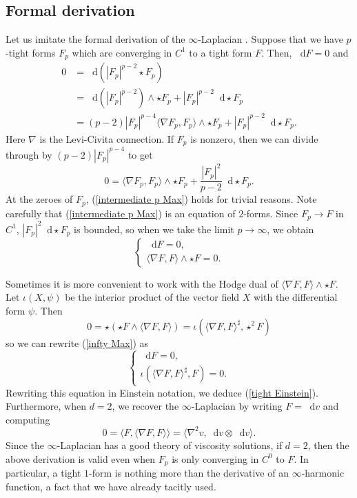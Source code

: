 \documentclass[reqno,11pt]{amsart}
\newcommand*\dif{\mathop{}\!\mathrm{d}}
\theoremstyle{definition}
\numberwithin{equation}{section}
\begin{document}
\subsection{Formal derivation}
Let us imitate the formal derivation of the $\infty$-Laplacian \cite{Aronsson67}.
Suppose that we have $p$-tight forms $F_p$ which are converging in $C^1$ to a tight form $F$.
Then, $\dif F = 0$ and
\begin{align*}
0
&= \dif(|F_p|^{p - 2} \star F_p) \\
&= \dif(|F_p|^{p - 2}) \wedge \star F_p + |F_p|^{p - 2} \dif \star F_p \\
&= (p - 2) |F_p|^{p - 4} \langle \nabla F_p, F_p\rangle \wedge \star F_p + |F_p|^{p - 2} \dif \star F_p.
\end{align*}
Here $\nabla$ is the Levi-Civita connection.
If $F_p$ is nonzero, then we can divide through by $(p - 2) |F_p|^{p - 4}$ to get
\begin{equation}\label{intermediate p Max}
0 = \langle\nabla F_p, F_p\rangle \wedge \star F_p + \frac{|F_p|^2}{p - 2} \dif \star F_p.
\end{equation}
At the zeroes of $F_p$, (\ref{intermediate p Max}) holds for trivial reasons.
Note carefully that (\ref{intermediate p Max}) is an equation of $2$-forms.
Since $F_p \to F$ in $C^1$, $|F_p|^2 \dif \star F_p$ is bounded, so when we take the limit $p \to \infty$, we obtain 
\begin{equation}\label{infty Max}
\begin{cases}
\dif F = 0, \\
\langle \nabla F, F\rangle \wedge \star F = 0.
\end{cases}
\end{equation}

Sometimes it is more convenient to work with the Hodge dual of $\langle \nabla F, F\rangle \wedge \star F$.
Let $\iota(X, \psi)$ be the interior product of the vector field $X$ with the differential form $\psi$.
Then 
$$0 = \star(\star F \wedge \langle \nabla F, F\rangle) = \iota(\langle \nabla F, F\rangle^\sharp, \star^2 F)$$
so we can rewrite (\ref{infty Max}) as
\begin{equation}\label{dual infty Max}
\begin{cases}
\dif F = 0, \\
\iota(\langle \nabla F, F\rangle^\sharp, F) = 0.
\end{cases}
\end{equation}
Rewriting this equation in Einstein notation, we deduce (\ref{tight Einstein}).
Furthermore, when $d = 2$, we recover the $\infty$-Laplacian by writing $F = \dif v$ and computing 
$$0 = \langle F, \langle \nabla F, F\rangle\rangle = \langle \nabla^2 v, \dif v \otimes \dif v\rangle.$$
Since the $\infty$-Laplacian has a good theory of viscosity solutions, if $d = 2$, then the above derivation is valid even when $F_p$ is only converging in $C^0$ to $F$.
In particular, a tight $1$-form is nothing more than the derivative of an $\infty$-harmonic function, a fact that we have already tacitly used.
\end{document}
